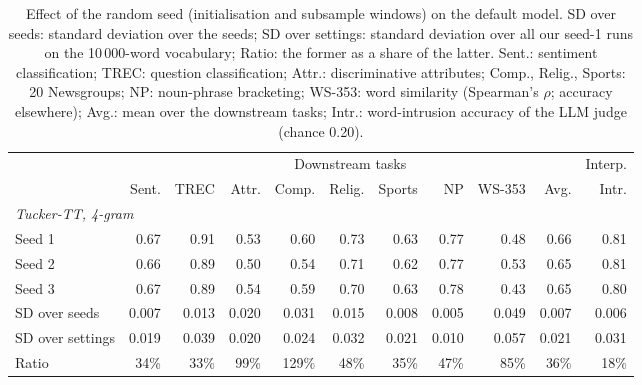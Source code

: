 \begin{table}[t]
  \centering
  \small
  \begin{tabular}{lrrrrrrrrrr}
    \toprule
     & \multicolumn{9}{c}{Downstream tasks} & \multicolumn{1}{c}{Interp.} \\
    \cmidrule(lr){2-10} \cmidrule(lr){11-11}
     & Sent. & TREC & Attr. & Comp. & Relig. & Sports & NP & WS-353 & Avg. & Intr. \\
    \midrule
    \multicolumn{11}{l}{\textit{Tucker-TT, 4-gram}} \\
    Seed 1 & 0.67 & 0.91 & 0.53 & 0.60 & 0.73 & 0.63 & 0.77 & 0.48 & 0.66 & 0.81 \\
    Seed 2 & 0.66 & 0.89 & 0.50 & 0.54 & 0.71 & 0.62 & 0.77 & 0.53 & 0.65 & 0.81 \\
    Seed 3 & 0.67 & 0.89 & 0.54 & 0.59 & 0.70 & 0.63 & 0.78 & 0.43 & 0.65 & 0.80 \\
    \midrule
    SD over seeds & 0.007 & 0.013 & 0.020 & 0.031 & 0.015 & 0.008 & 0.005 & 0.049 & 0.007 & 0.006 \\
    SD over settings & 0.019 & 0.039 & 0.020 & 0.024 & 0.032 & 0.021 & 0.010 & 0.057 & 0.021 & 0.031 \\
    Ratio & 34\% & 33\% & 99\% & 129\% & 48\% & 35\% & 47\% & 85\% & 36\% & 18\% \\
    \bottomrule
  \end{tabular}
  \caption{Effect of the random seed (initialisation and subsample windows) on the default model. SD over seeds: standard deviation over the seeds; SD over settings: standard deviation over all our seed-1 runs on the 10\,000-word vocabulary; Ratio: the former as a share of the latter. Sent.: sentiment classification; TREC: question classification; Attr.: discriminative attributes; Comp., Relig., Sports: 20 Newsgroups; NP: noun-phrase bracketing; WS-353: word similarity (Spearman's $\rho$; accuracy elsewhere); Avg.: mean over the downstream tasks; Intr.: word-intrusion accuracy of the LLM judge (chance 0.20).}
  \label{tab:seeds}
\end{table}

